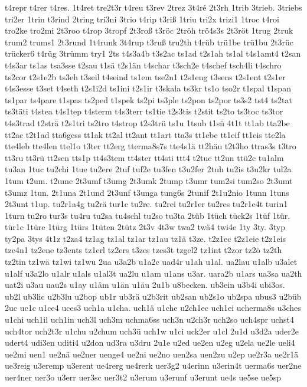 {t4repr
t4rer
t4res.
1t4ret
tre2t3r
t4reu
t3rev
2trez
3t4ré
2t3rh
1trib
3trieb.
3triebs
tri2er
1trin
t3rind
2tring
tri3ni
3trio
t4rip
t3riß
1triu
tri2x
trizi1
1troc
t4roi
tro2ke
tro2mi
2t3roo
t4rop
3tropf
2t3roß
t3röc
2tröh
trö4s3s
2t3röt
1trug
2truk
trum2
trums1
2t3rund
1t4runk
3t4rup
t3ruß
tru2th
t4rüb
trü1be
trü1bu
2t3rüc
trücker6
t4rüg
3trümm
try1
2ts
t4s3a4b
t3s2ac
ts1ad
t2s1ah
ts1al
t4s1amt4
t2san
t4s3ar
ts1as
tsa3sse
t2sau
t1sä
t2s1än
t4schar
t3sch2e
t4schef
tsch4li
t4schro
ts2cor
t2s1e2b
ts3eh
t3seil
t4seind
ts1em
tse2n1
t2s1eng
t3sens
t2s1ent
t2s1er
t4s3esse
t3set
t4seth
t2s1i2d
ts1ini
t2s1ir
t3skala
ts3kr
ts1o
tso2r
t1spal
t1span
ts1par
ts4pare
t1spas
ts2ped
t1spek
ts2pi
ts3ple
ts2pon
ts2por
ts3s2
tst4
ts2tat
ts3täti
t4stea
t4s1tep
t4sterm
t4s3terr
ts1tie
t2s3tis
t2stit
ts2to
ts3toc
ts3tor
t4s3trad
t2strä
t2s1tri
ts2tro
t4strop
t2s3trü
ts1u
1tsub
t1sü
4t1t
tt1ab
tta2be
tt2ac
t2t1ad
tta6gess
tt1ak
tt2al
tt2ant
tt1art
tta3s
tt1ebe
tt1eif
tt1eis
tte2la
tte4leb
tte4len
ttel1o
t3ter
tt2erg
tterma8s7s
tte4s1ä
tt2häu
t2t3ho
ttras3s
t3tro
tt3ru
tt3rü
tt2sen
tts1p
tt4s3tem
tt4ster
tt4sti
ttt4
t2tuc
tt2un
ttü2c
tu1alm
tu3an
1tuc
tu2chi
1tue
tu2ere
2tuf
tuf2e
tu3fen
t3u2fer
2tuh
tu2is
t3u2kr
tul2a
1tum
t2um.
t2ume
2t3umf
t3umg
2t3umk
2tump
t3umr
tum2si
tum2so
2t3umt
t3umz
1tun.
2t1una
2t1und
2t3unf
t3unga
tung6s
2tunif
2t1u2nio
1tunn
1tuns
2t3unt
t1up.
tu2r1a4g
tu2rä
tur1c
tu2re.
tu2rei
tu2r1er
tu2res
tu2r1e4t
turin1
1turn
tu2ro
tur3s
tu4ru
tu2sa
tu4schl
tu2so
tu3ta
2tüb
1tüch
tück2s
1tüf
1tür.
tür1c
1türe
1türg
1türs
1tüten
2tütz
2t3v
4t3w
twa2
twä4
twi4e
1ty
3ty.
3typ
ty2pa
3tys
4t1z
t2za4
tz1ag
tz1al
tz1ar
tz1au
tz1ä
t3ze.
t2z1ec
t2z1eie
t2z1eis
tze4n1
tz2ene
tz3ents
tz1erl
tz2ers
t3zes
tzes3t
tzgel2
tz1int
t2zor
tz2ö
tz2th
tz2tin
tz1wä
tz1wi
tz1wu
2ua
u3a2b
u1a2c
uad4r
u1ah
u1al.
ua2lau
u1alb
u3alet
u1alf
u3a2lo
u1alr
u1als
u1al3t
ua2lu
u1am
u1ans
u3ar.
uara2b
u1ars
ua3sa
ua2th
uat2i
u3au
uau2s
u1ay
u1äm
u1än
u1äu
2u1b
u8becken.
ub3ein
u3b4i
ubi3os.
ub2l
ub3lic
u2b3lu
u2bop
ub1r
ub3rä
u2b3rit
ub2san
ub2s1o
ub2spa
ubus3
u2büb
2uc
uc1c
u1ce4
uces3
uch1a
u1cha.
uch1ä
u1che
u2ch1ec
uch1ei
ucherma8s
u3ches
u1chi
uch1il
uch1in
uch3l
uch3m
uchma6ss
uch3n
u2ch3r
uch2so
uch4spr
uchst4
uch4tor
uch2t3r
u1chu
u2chum
uch3ü
uch1w
u1ci
uck2er
u1cl
2u1d
u3d2a
uder2e
udert4
udi3en
uditi4
u2don
ud3ra
u3dru
2u1e
u2ed
ue2en
u2eg
u2ela
ue2le
ueli4
ue2mi
uen1
ue2nä
ue2ner
uenge4
ue2ni
ue2no
uen2sa
uen2zu
u2ep
ue2r3a
ue2r1ä
ue3reig
u3eremp
u3erent
ue4rerg
ue4rerk
uer3g2
u4erinn
u3erin4t
uerma6s
uer2ne
uer4ner
uer3o
u3err
uer3sc
uer3t2
u3erum
u3erunf
u3erunt
ue4s
ue5se
ue5sp
}
